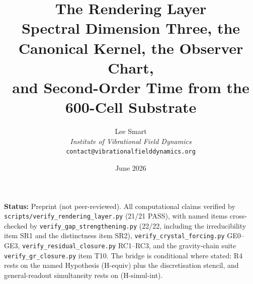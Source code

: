 \documentclass[12pt]{article}
\title{The Rendering Layer\\[6pt]
\large Spectral Dimension Three, the Canonical Kernel, the Observer Chart,\\ and Second-Order Time from the 600-Cell Substrate}
\author{Lee Smart\\ \textit{Institute of Vibrational Field Dynamics}\\ \texttt{contact@vibrationalfielddynamics.org}}
\date{June 2026}
\theoremstyle{definition}
\theoremstyle{remark}
\begin{document}
\maketitle

\noindent\textbf{Status:} Preprint (not peer-reviewed). All computational claims verified by \texttt{scripts/verify\_rendering\_layer.py} (21/21 PASS), with named items cross-checked by \texttt{verify\_gap\_strengthening.py} (22/22, including the irreducibility item SR1 and the distinctness item SR2), \texttt{verify\_crystal\_forcing.py} GE0--GE3, \texttt{verify\_residual\_closure.py} RC1--RC3, and the gravity-chain suite \texttt{verify\_gr\_closure.py} item T10. The bridge is conditional where stated: R4 rests on the named Hypothesis (H-equiv) plus the discretisation stencil, and general-readout simultaneity rests on (H-simul-int).
\end{document}
